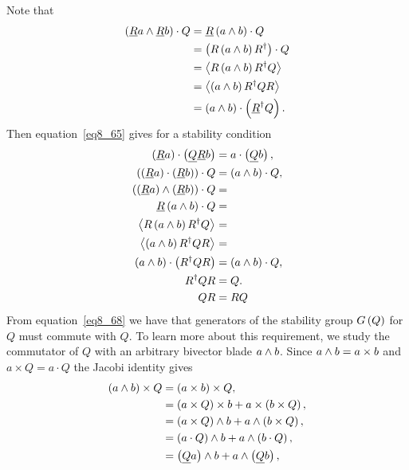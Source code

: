 Note that
\begin{align}
	\left ( {\underline{R}a\wedge\underline{R}b} \right )\cdot Q &= \underline{R}\left ( {a\wedge b} \right )\cdot Q \nonumber \\
                                        &= \left ( {R\left ( {a\wedge b} \right ) R^{\dagger}} \right )\cdot Q \nonumber \\
                                        &= \left < {R\left ( {a\wedge b} \right ) R^{\dagger}Q} \right >_{} \nonumber \\
                                        &= \left < {\left ( {a\wedge b} \right ) R^{\dagger}QR} \right >_{} \nonumber \\
                                        &= \left ( {a\wedge b} \right )\cdot\left ( {\underline{R}^{\dagger}Q} \right ).
\end{align}
Then equation~\ref{eq8_65} gives for a stability condition 
\begin{align}
	\left ( {\underline{R}a} \right )\cdot\left ( {\underline{Q}\underline{R}b} \right ) &= a\cdot\left ( {\underline{Q}b} \right ), \nonumber \\
	\left ( {\left ( {\underline{R}a} \right )\cdot\left ( {\underline{R}b} \right )} \right )\cdot Q &= \left ( {a\wedge b} \right )\cdot Q, \nonumber \\
    \left ( {\left ( {\underline{R}a} \right )\wedge\left ( {\underline{R}b} \right )} \right )\cdot Q &=  \nonumber \\
    \underline{R}\left ( {a\wedge b} \right )\cdot Q &= \nonumber \\
	\left < {R\left ( {a\wedge b} \right ) R^{\dagger}Q} \right >_{} &= \nonumber \\
	\left < {\left ( {a\wedge b} \right ) R^{\dagger}QR} \right >_{} &= \nonumber \\
	\left ( {a\wedge b} \right )\cdot\left ( {R^{\dagger}QR} \right ) &= \left ( {a\wedge b} \right )\cdot Q, \nonumber \\		
	 R^{\dagger}QR &= Q.\nonumber \\
	 QR &= RQ\label{eq8_68}
\end{align}
From equation~\ref{eq8_68} we have that generators of the stability group ${G}\left ( {Q} \right )$ for $Q$ must
commute with $Q$.  To learn more about this requirement, we study the commutator of $Q$ with an
arbitrary bivector blade $a\wedge b$.  Since $a\wedge b=a\times b$ and $a\times Q = a\cdot Q$ the Jacobi 
identity gives
\begin{align}
	\left ( {a\wedge b} \right )\times Q &= \left ( {a\times b} \right )\times Q, \nonumber \\
	                      &= \left ( {a\times Q} \right )\times b+a\times\left ( {b\times Q} \right ), \nonumber \\
	                      &= \left ( {a\times Q} \right )\wedge b+a\wedge\left ( {b\times Q} \right ), \nonumber \\
	                      &= \left ( {a\cdot Q} \right )\wedge b+a\wedge\left ( {b\cdot Q} \right ), \nonumber \\
	                      &= \left ( {\underline{Q}a} \right )\wedge b+a\wedge\left ( {\underline{Q}b} \right ),\label{eq8_69}
\end{align}
